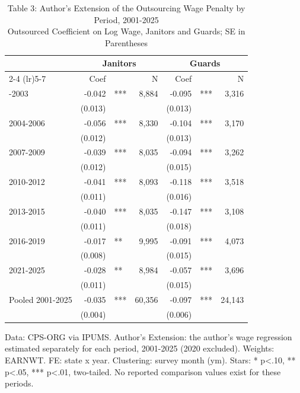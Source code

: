 \begin{table}[!t]
\caption*{
{\large Table 3: Author's Extension of the Outsourcing Wage Penalty by Period, 2001-2025} \\
{\small Outsourced Coefficient on Log Wage, Janitors and Guards; SE in Parentheses}
} 

\fontsize{10.0pt}{12.0pt}\selectfont

\centering\begin{tabular}{l|rlrrlr}
\toprule
  & \multicolumn{3}{c}{Janitors} & \multicolumn{3}{c}{Guards} \\ 
\cmidrule(lr){2-4} \cmidrule(lr){5-7}
  & Coef &  & N & Coef &  & N \\ 
\midrule\addlinespace[2.5pt]
2001-2003 & -0.042 & *** & 8,884 & -0.095 & *** & 3,316 \\
 & (0.013) &  &  & (0.013) &  &  \\
2004-2006 & -0.056 & *** & 8,330 & -0.104 & *** & 3,170 \\
 & (0.012) &  &  & (0.013) &  &  \\
2007-2009 & -0.039 & *** & 8,035 & -0.094 & *** & 3,262 \\
 & (0.012) &  &  & (0.015) &  &  \\
2010-2012 & -0.041 & *** & 8,093 & -0.118 & *** & 3,518 \\
 & (0.011) &  &  & (0.016) &  &  \\
2013-2015 & -0.040 & *** & 8,035 & -0.147 & *** & 3,108 \\
 & (0.011) &  &  & (0.018) &  &  \\
2016-2019 & -0.017 & ** & 9,995 & -0.091 & *** & 4,073 \\
 & (0.008) &  &  & (0.015) &  &  \\
2021-2025 & -0.028 & ** & 8,984 & -0.057 & *** & 3,696 \\
 & (0.011) &  &  & (0.015) &  &  \\
Pooled 2001-2025 & -0.035 & *** & 60,356 & -0.097 & *** & 24,143 \\
 & (0.004) &  &  & (0.006) &  &  \\
\bottomrule
\end{tabular}\par\raggedright
\begin{minipage}{\linewidth}
Data: CPS-ORG via IPUMS. Author's Extension: the author's wage regression estimated separately for each period, 2001-2025 (2020 excluded). Weights: EARNWT. FE: state x year. Clustering: survey month (ym). Stars: * p<.10, ** p<.05, *** p<.01, two-tailed. No reported comparison values exist for these periods.\\
\end{minipage}
\end{table}
